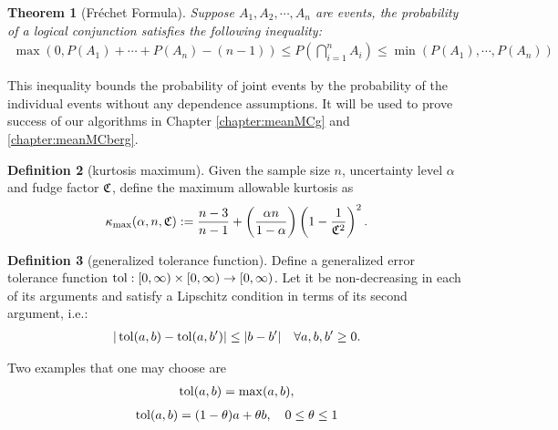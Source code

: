 \documentclass{iitthesis}
\newtheorem{theorem}{Theorem}[section]
\theoremstyle{definition}
\newtheorem{defn}[theorem]{Definition}
\begin{document}

\begin{theorem}[Fr\'{e}chet Formula] \cite{Frechet35}
Suppose $A_1, A_2,\cdots,A_n$ are events, the probability of a logical conjunction satisfies the following inequality:
\begin{multline}
 \max(0, P(A_1) + \cdots +P(A_n)-(n -1)) \leq P\left(\bigcap_{i=1}^n A_i\right) \leq \min(P(A_1),  \cdots, P(A_n))
\end{multline}
\end{theorem}
This inequality bounds the probability of joint events by the probability of the individual events without any dependence assumptions. It will be used to prove success of our algorithms in Chapter \ref{chapter:meanMCg} and \ref{chapter:meanMCberg}.


\begin{defn}[kurtosis maximum]
Given the sample size $n$, uncertainty level $\alpha$ and fudge factor $\mathfrak{C}$, define the maximum allowable kurtosis as
\begin{equation}
\label{def:kmax}
\kappa_{\max}(\alpha, n,\mathfrak{C}):= \frac{n-3}{n-1} + \left(\frac{ \alpha n}{1-\alpha}\right) \left(1 - \frac{1}{\mathfrak{C}^2}\right)^2.
\end{equation}
\end{defn}

\begin{defn}[generalized tolerance function]\label{def:tolfun}
 Define a generalized error tolerance function $\operatorname{tol}: [0, \infty) \times [0, \infty) \to [0,\infty)$. Let it be non-decreasing in each of its arguments and satisfy a Lipschitz condition in terms of its second argument, i.e.:
\begin{align*}
|\operatorname{tol}(a,b)-\operatorname{tol}(a,b')| \leq |b-b'| \quad \forall a,b,b' \geq 0.
\end{align*}
\end{defn}
Two examples that one may choose are
\begin{align*}
\operatorname{tol}(a,b) = \max (a,b),
\end{align*}
\begin{align*}
\operatorname{tol}(a,b) = (1- \theta) a + \theta b, \quad 0 \leq \theta \leq 1
\end{align*}
\end{document}

